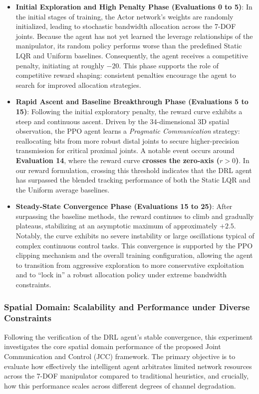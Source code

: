 \begin{itemize}
    \item \textbf{Initial Exploration and High Penalty Phase (Evaluations 0 to 5)}: In the initial stages of training, the Actor network's weights are randomly initialized, leading to stochastic bandwidth allocation across the 7-DOF joints. Because the agent has not yet learned the leverage relationships of the manipulator, its random policy performs worse than the predefined Static LQR and Uniform baselines. Consequently, the agent receives a competitive penalty, initiating at roughly $-20$. This phase supports the role of competitive reward shaping: consistent penalties encourage the agent to search for improved allocation strategies.
    \item \textbf{Rapid Ascent and Baseline Breakthrough Phase (Evaluations 5 to 15)}: Following the initial exploratory penalty, the reward curve exhibits a steep and continuous ascent. Driven by the 34-dimensional 3D spatial observation, the PPO agent learns a \textit{Pragmatic Communication} strategy: reallocating bits from more robust distal joints to secure higher-precision transmission for critical proximal joints. A notable event occurs around \textbf{Evaluation 14}, where the reward curve \textbf{crosses the zero-axis ($r>0$)}. In our reward formulation, crossing this threshold indicates that the DRL agent has surpassed the blended tracking performance of both the Static LQR and the Uniform average baselines.
    \item \textbf{Steady-State Convergence Phase (Evaluations 15 to 25)}: After surpassing the baseline methods, the reward continues to climb and gradually plateaus, stabilizing at an asymptotic maximum of approximately $+2.5$. Notably, the curve exhibits no severe instability or large oscillations typical of complex continuous control tasks. This convergence is supported by the PPO clipping mechanism and the overall training configuration, allowing the agent to transition from aggressive exploration to more conservative exploitation and to ``lock in'' a robust allocation policy under extreme bandwidth constraints.
\end{itemize}
\subsubsection{Spatial Domain: Scalability and Performance under Diverse Constraints}
Following the verification of the DRL agent's stable convergence, this experiment investigates the core spatial domain performance of the proposed Joint Communication and Control (JCC) framework.
The primary objective is to evaluate how effectively the intelligent agent arbitrates limited network resources across the 7-DOF manipulator compared to traditional heuristics, and crucially, how this performance scales across different degrees of channel degradation.

